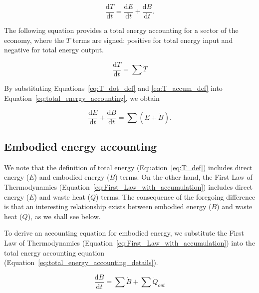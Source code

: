 \begin{equation} \label{eq:T_accum_def}
	\frac{\mathrm{d}T}{\mathrm{d}t} 
	= \frac{\mathrm{d}E}{\mathrm{d}t} 
	+ \frac{\mathrm{d}B}{\mathrm{d}t}.
\end{equation}

The following equation provides a total energy accounting 
for a sector of the economy, where the $\dot{T}$ terms
are signed: positive for total energy input and negative
for total energy output.

\begin{equation} \label{eq:total_energy_accounting}
		\frac{\mathrm{d}T}{\mathrm{d}t}
		= \sum \dot{T}
\end{equation}

By substituting Equations~\ref{eq:T_dot_def} and
\ref{eq:T_accum_def} into 
Equation~\ref{eq:total_energy_accounting},
we obtain

\begin{equation} \label{eq:total_energy_accounting_details}
	\frac{\mathrm{d}E}{\mathrm{d}t} 
	+ \frac{\mathrm{d}B}{\mathrm{d}t}
	= \sum{\left( \dot{E} 
			+ \dot{B} \right)}.
\end{equation}


\subsection{Embodied energy accounting}

We note that the definition of total energy 
(Equation~\ref{eq:T_def}) includes direct energy ($E$) 
and embodied energy ($B$) terms. 
On the other hand, the First Law of Thermodynamics 
(Equation~\ref{eq:First_Law_with_accumulation})
includes direct energy ($E$) and waste heat ($Q$) terms. 
The consequence of the foregoing difference is that 
an interesting relationship exists between embodied energy ($B$) 
and waste heat ($Q$), as we shall see below. 

To derive an accounting equation for embodied energy, we substitute the 
First Law of Thermodynamics (Equation~\ref{eq:First_Law_with_accumulation})
into the total energy accounting equation (Equation~\ref{eq:total_energy_accounting_details}).

\begin{equation} \label{eq:embodied_energy_accounting}
	\frac{\mathrm{d}B}{\mathrm{d}t}
	= \sum \dot{B} 
	+ \sum \dot{Q}_{out}
\end{equation}

